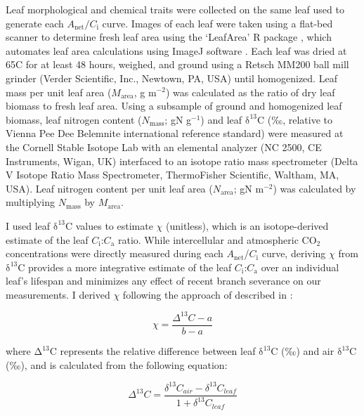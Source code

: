 Leaf morphological and chemical traits were collected on the same leaf used to generate each $A_\mathrm{net}/C_\mathrm{i}$ curve. Images of each leaf were taken using a flat-bed scanner to determine fresh leaf area using the `LeafArea' R package , which automates leaf area calculations using ImageJ software . Each leaf was dried at 65\textdegree{}C for at least 48 hours, weighed, and ground using a Retsch MM200 ball mill grinder (Verder Scientific, Inc., Newtown, PA, USA) until homogenized. Leaf mass per unit leaf area ($M_\mathrm{area}$, g m$^{-2}$) was calculated as the ratio of dry leaf biomass to fresh leaf area. Using a subsample of ground and homogenized leaf biomass, leaf nitrogen content ($N_\mathrm{mass}$; gN g$^{-1}$) and leaf $\mathrm{\delta^{13}C}$ (‰, relative to Vienna Pee Dee Belemnite international reference standard) were measured at the Cornell Stable Isotope Lab with an elemental analyzer (NC 2500, CE Instruments, Wigan, UK) interfaced to an isotope ratio mass spectrometer (Delta V Isotope Ratio Mass Spectrometer, ThermoFisher Scientific, Waltham, MA, USA). Leaf nitrogen content per unit leaf area ($N_\mathrm{area}$; gN m$^{-2}$) was calculated by multiplying $N_\mathrm{mass}$ by $M_\mathrm{area}$.

I used leaf $\mathrm{\delta^{13}}$C values to estimate $\chi$ (unitless), which is an isotope-derived estimate of the leaf $C_\mathrm{i}$:$C_\mathrm{a}$ ratio. While intercellular and atmospheric CO$_2$ concentrations were directly measured during each $A_\mathrm{net}$/$C_\mathrm{i}$ curve, deriving $\chi$ from $\mathrm{\delta^{13}}$C provides a more integrative estimate of the leaf $C_\mathrm{i}$:$C_\mathrm{a}$ over an individual leaf’s lifespan and minimizes any effect of recent branch severance on our measurements. I derived $\chi$ following the approach of  described in :

\begin{equation} \label{eq_2.1}
    \chi= \frac{\Delta^{13}C-a}{b-a}
\end{equation}

\noindent where $\mathrm{\Delta^{13}}$C represents the relative difference between leaf $\mathrm{\delta^{13}}$C (‰) and air $\mathrm{\delta^{13}}$C (‰), and is calculated from the following equation:

\begin{equation} \label{eq_2.2}
    \Delta^{13}C= \frac{\delta^{13}C_{air}-\delta^{13}C_{leaf}}{1+\delta^{13}C_{leaf}}
\end{equation}
    
